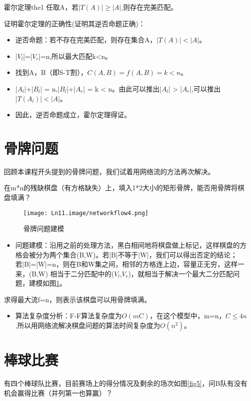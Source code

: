 \begin{theorem}{霍尔定理}{the1}
  任取A\subseteqVl，若\(|T(A)| \ge |A|\),则存在完美匹配。
\end{theorem}
证明霍尔定理的正确性(证明其逆否命题正确)：
\begin{itemize}
  \item 逆否命题：若不存在完美匹配，则存在集合A，\(|T(A)| < |A|\)。
  \item |\(V_l\)|=|\(V_r\)|=n,所以最大匹配k<n。
  \item 找到A，B（即S-T割），\(C(A,B) = f(A,B) = k<n\)。
  \item |\(A_l\)|+|\(B_l\)| = n,|\(B_l\)|+|\(A_r\)| = k < n。由此可以推出|\(A_l\)| > |\(A_r\)|,可以推出\(|T(A_l)| < |A|\)。
  \item 因此，逆否命题成立，霍尔定理得证。
\end{itemize}

\section{骨牌问题}
回顾本课程开头提到的骨牌问题，我们试着用网络流的方法再次解决。
\begin{example}
    在m*n的残缺棋盘（有方格缺失）上，填入1*2大小的矩形骨牌，能否用骨牌将棋盘填满？
\end{example}

\begin{figure}[htb]
  \centering
  \texttt{[image: Ln11.image/networkflow4.png]}
  \caption{骨牌问题建模}\label{fig4}
\end{figure}

\begin{itemize}
  \item 问题建模：沿用之前的处理方法，黑白相间地将棋盘做上标记，这样棋盘的方格会被分为两个集合(B,W)。若|B|不等于|W|，我们可以得出否定的结论；若|B|=|W|=n，则在B和W集之间，相邻的方格连上边，容量正无穷，这样一来，(B,W) 相当于二分匹配中的(\(V_l\),\(V_r\))，就相当于解决一个最大二分匹配问题，建模如图\ref{fig4}。
\end{itemize}

求得最大流f=n，则表示该棋盘可以用骨牌填满。
\begin{itemize}
 \item 算法复杂度分析：F-F算法复杂度为\(O(mC)\)，在这个模型中，m=n，\(C \le 4n\),所以用网络流解决棋盘问题的算法时间复杂度为\(O(n^2)\)。
\end{itemize}

\section{棒球比赛}
\begin{example}
有四个棒球队比赛，目前赛场上的得分情况及剩余的场次如图\ref{fig5}，问B队有没有机会赢得比赛（并列第一也算赢）？
\end{example}

